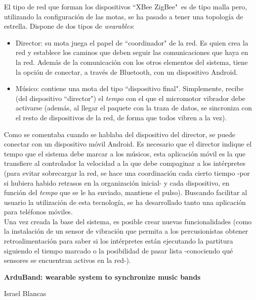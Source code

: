 El tipo de red que forman los dispositivos ``XBee ZigBee"\ es de tipo malla pero, utilizando la configuración
de las motas, se ha pasado a tener una topología de estrella. Dispone de dos tipos de  \textit{wearables}:
  \begin{itemize}
  \item Director: su mota juega el papel de ``coordinador" de la red. Es quien crea la red y establece los caminos que
  deben seguir las comunicaciones que haya en la red. Además de la comunicación con los otros elementos del sistema,
  tiene la opción de conectar, a través de Bluetooth, con un dispositivo Android.
  \item Músico: contiene una mota del tipo ``dispositivo final". Simplemente, recibe (del dispositivo ``director")
  el \textit{tempo} con el que el micromotor vibrador debe activarse (además, al llegar el paquete con la traza de datos, se
  sincroniza con el resto de dispositivos de la red, de forma que todos vibren a la vez).
  \end{itemize}

Como se comentaba cuando se hablaba del dispositivo del director, se puede conectar
con un dispositivo móvil Android. Es necesario que el director indique el tempo que el
sistema debe marcar a los músicos, esta aplicación móvil es la que transfiere al controlador la
velocidad a la que debe compaginar a los intérpretes (para evitar sobrecargar la red, se hace una
coordinación cada cierto tiempo -por si hubiera habido retrasos en la organización inicial- y cada
dispositivo, en función del \textit{tempo} que se le ha enviado, mantiene el pulso). Buscando facilitar al usuario la utilización
de esta tecnología, se ha desarrollado tanto una aplicación para teléfonos móviles.\\

Una vez creada la base del sistema, es posible crear nuevas funcionalidades (como la instalación de un
sensor de vibración que permita a los percusionistas obtener retroalimentación para saber si los intérpretes
están ejecutando la partitura siguiendo el tiempo marcado o la posibilidad de pasar lista -conociendo qué sensores
se encuentran activos en la red-).\\

\cleardoublepage


\thispagestyle{empty}


\begin{center}
{\large\bfseries ArduBand: wearable system to synchronize music bands}\\
\end{center}
\begin{center}
Israel Blancas\\
\end{center}

